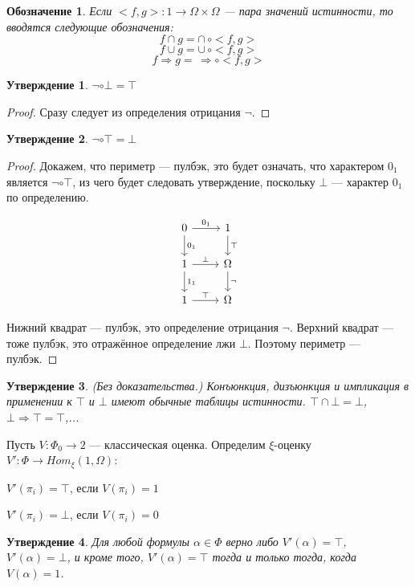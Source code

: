 \documentclass[a4paper, 12pt]{article}
\newtheorem{notation}{Обозначение}
\newtheorem{exercise}{Утверждение}
\begin{document}
\begin{notation}
Если $<f, g>\colon 1\to \Omega\times\Omega$ --- пара значений истинности, то вводятся следующие обозначения:
$$ f\cap g = \cap\,\circ<f, g> $$ 
$$ f\cup g = \cup\,\circ<f, g> $$ 
$$ f\Rightarrow g = \,\Rightarrow\circ<f, g> $$ 
\end{notation}


\begin{exercise}
$\neg\circ \bot = \top$
\end{exercise}
\begin{proof}
Сразу следует из определения отрицания $\neg$.
\end{proof}

\begin{exercise}
$\neg\circ \top = \bot$
\end{exercise}
\begin{proof}

Докажем, что периметр --- пулбэк, это будет означать, что
характером $0_1$ является $\neg\circ \top$, из чего будет следовать утверждение, поскольку $\bot$ --- характер $0_1$ по определению.
  
\[
\begin{tikzcd}
0 \arrow{d}{0_1}
 \arrow{r}{0_1}
& 1 \arrow{d}{\top}
 \\
1 \arrow{r}{\bot} \arrow{d}{1_1} & \Omega \arrow{d}{\neg} \\
1 \arrow{r}{\top}
& \Omega
\end{tikzcd}
\]

Нижний квадрат --- пулбэк, это определение отрицания $\neg$. Верхний квадрат --- тоже пулбэк, это отражённое определение лжи $\bot$. Поэтому периметр --- пулбэк.\end{proof}
\begin{exercise} (Без доказательства.) Конъюнкция, дизъюнкция и импликация в применении к $\top$ и $\bot$ имеют обычные таблицы истинности. $\top\cap \bot = \bot$, $\bot\Rightarrow\top = \top$,...
\end{exercise}

Пусть $V\colon\Phi_0\to 2$ --- классическая оценка. Определим $\xi$-оценку $V'\colon\Phi\to Hom_\xi(1, \Omega)$:

$V'(\pi_i)=\top$, если $V(\pi_i)=1$

$V'(\pi_i)=\bot$, если $V(\pi_i)=0$

\begin{exercise}
Для любой формулы $\alpha\in\Phi$ верно либо $V'(\alpha)=\top$, $V'(\alpha)=\bot$, и кроме того, $V'(\alpha)=\top$ тогда и только тогда, когда $V(\alpha)=1$. 
\end{exercise}
\end{document}
